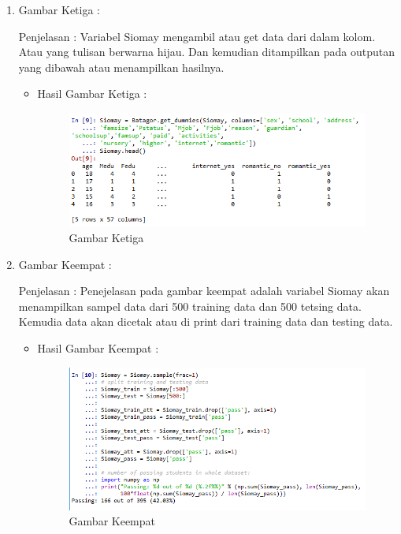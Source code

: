 \begin{itemize}
\begin{enumerate}
\begin{itemize}
\end{itemize}
\par
\item  Gambar Ketiga :
\par Penjelasan : Variabel Siomay mengambil atau get data dari dalam kolom. Atau yang tulisan berwarna hijau. Dan kemudian ditampilkan pada outputan yang dibawah atau menampilkan hasilnya.
\par 
\begin{itemize}
\par
\item Hasil  Gambar Ketiga :

\begin{figure}[ht]
\centering
\includegraphics[scale=0.5]{figures/AIP/jd3.PNG}
\caption{ Gambar Ketiga}
\label{3}
\end{figure}

\end{itemize}
\par
\item  Gambar Keempat :
\par Penjelasan : Penejelasan pada gambar keempat adalah variabel Siomay akan menampilkan sampel data dari 500 training data dan 500 tetsing data. Kemudia data akan dicetak atau di print dari training data dan testing data.
\par 
\begin{itemize}
\par
\item Hasil  Gambar Keempat :

\begin{figure}[ht]
\centering
\includegraphics[scale=0.5]{figures/AIP/jd4.PNG}
\caption{ Gambar Keempat}
\label{4}
\end{figure}


\end{itemize}
\end{enumerate}
\end{itemize}

